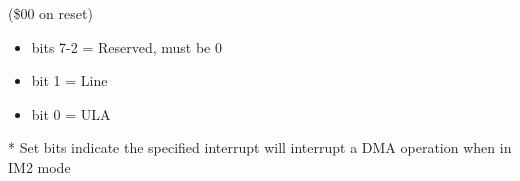 (\$00 on reset)
\begin{itemize}
\item bits 7-2 = Reserved, must be 0
\item bit 1 = Line
\item bit 0 = ULA
\end{itemize}
* Set bits indicate the specified interrupt will interrupt a DMA
  operation when in IM2 mode
